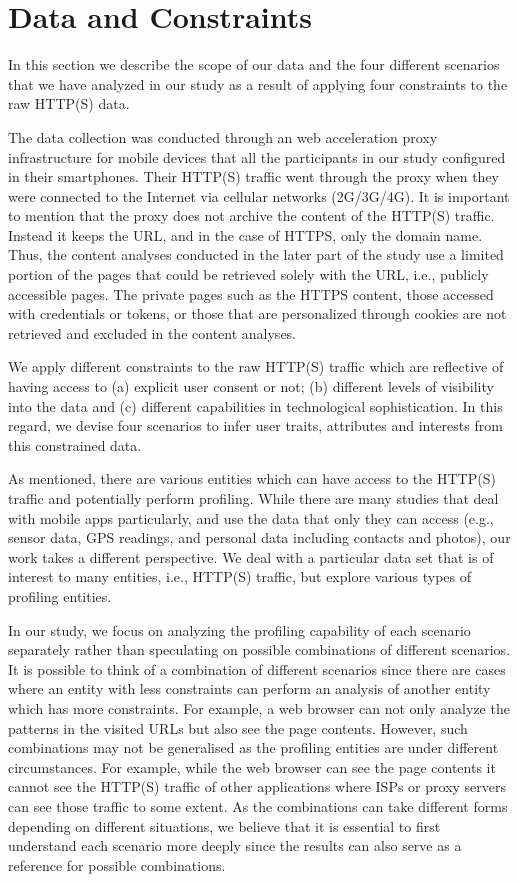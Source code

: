 \section{Data and Constraints}
In this section we describe the scope of our data and the four different scenarios that we have analyzed in our study as a result of applying four constraints to the raw HTTP(S) data.

The data collection was conducted through an web acceleration proxy infrastructure for mobile devices that all the participants in our study configured in their smartphones. Their HTTP(S) traffic went through the proxy when they were connected to the Internet via cellular networks (2G/3G/4G). It is important to mention that the proxy does not archive the content of the HTTP(S) traffic. Instead it keeps the URL, and in the case of HTTPS, only the domain name. Thus, the content analyses conducted in the later part of the study use a limited portion of the pages that could be retrieved solely with the URL, i.e., publicly accessible pages. The private pages such as the HTTPS content, those accessed with credentials or tokens, or those that are personalized through cookies are not retrieved and excluded in the content analyses.

We apply different constraints to the raw HTTP(S) traffic which are reflective of having access to (a) explicit user consent or not; (b) different levels of visibility into the data and (c) different capabilities in technological sophistication. In this regard, we devise four scenarios to infer user traits, attributes and interests from this constrained data. 

As mentioned, there are various entities which can have access to the HTTP(S) traffic and potentially perform profiling. While there are many studies \cite{enck2011study} that deal with mobile apps particularly, and use the data that only they can access (e.g., sensor data, GPS readings, and personal data including contacts and photos), our work takes a different perspective. We deal with a particular data set that is of interest to many entities, i.e., HTTP(S) traffic, but explore various types of profiling entities.

In our study, we focus on analyzing the profiling capability of each scenario separately rather than speculating on possible combinations of different scenarios. It is possible to think of a combination of different scenarios since there are cases where an entity with less constraints can perform an analysis of another entity which has more constraints. For example, a web browser can not only analyze the patterns in the visited URLs but also see the page contents. However, such combinations may not be generalised as the profiling entities are under different circumstances. For example, while the web browser can see the page contents it cannot see the HTTP(S) traffic of other applications where ISPs or proxy servers can see those traffic to some extent. As the combinations can take different forms depending on different situations, we believe that it is essential to first understand each scenario more deeply since the results can also serve as a reference for possible combinations.

